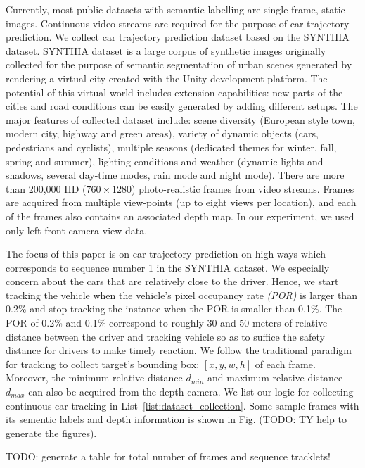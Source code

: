 \documentclass[10pt,twocolumn,letterpaper]{article}
\begin{document}
Currently, most public datasets with semantic labelling are single frame, static images. Continuous video streams are required for the purpose of car trajectory prediction.
We collect car trajectory prediction dataset based on the SYNTHIA~\cite{ros2016synthia} dataset.
SYNTHIA dataset is a large corpus of synthetic images originally collected for the purpose of semantic segmentation of urban scenes generated by rendering a virtual city created with the Unity development platform.
The potential of this virtual world includes extension capabilities: new parts of the cities and road conditions can be easily generated by adding different setups. The major features of collected dataset include: scene diversity (European style town, modern city, highway and green areas), variety of dynamic objects (cars, pedestrians and cyclists), multiple seasons (dedicated themes for winter, fall, spring and summer), lighting conditions and weather (dynamic lights and shadows, several day-time modes, rain mode and night mode).
There are more than 200,000 HD ($760\times1280$) photo-realistic frames from video streams.
Frames are acquired from multiple view-points (up to eight views per location), and each of the frames also contains an associated depth map. In our experiment, we used only left front camera view data.

The focus of this paper is on car trajectory prediction on high ways which corresponds to sequence number 1 in the SYNTHIA dataset. We especially concern about the cars that are relatively close to the driver. Hence, we start tracking the vehicle when the vehicle's pixel occupancy rate \emph{(POR)} is larger than 0.2\% and stop tracking the instance when the POR is smaller than 0.1\%. The POR of 0.2\% and 0.1\% correspond to roughly 30 and 50 meters of relative distance between the driver and tracking vehicle so as to suffice the safety distance for drivers to make timely reaction.
We follow the traditional paradigm for tracking to collect target's bounding box: $[x, y, w, h]$ of each frame. Moreover, the minimum relative distance $d_{min}$ and maximum relative distance $d_{max}$ can also be acquired from the depth camera.
We list our logic for collecting continuous car tracking in List~\ref{list:dataset_collection}.
Some sample frames with its sementic labels and depth information is shown in Fig. (TODO: TY help to generate the figures).

TODO: generate a table for total number of frames and sequence tracklets!
\end{document}
